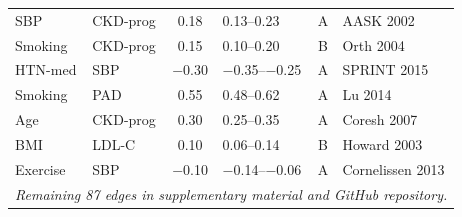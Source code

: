 \documentclass[runningheads]{llncs}
\begin{document}
{\begin{longtable}{@{}p{2.0cm}p{2.0cm}cp{1.4cm}cp{2.8cm}@{}}
SBP & CKD-prog & 0.18 & 0.13--0.23 & A & AASK 2002 \\
Smoking & CKD-prog & 0.15 & 0.10--0.20 & B & Orth 2004 \\
HTN-med & SBP & $-$0.30 & $-$0.35--$-$0.25 & A & SPRINT 2015 \\
Smoking & PAD & 0.55 & 0.48--0.62 & A & Lu 2014 \\
Age & CKD-prog & 0.30 & 0.25--0.35 & A & Coresh 2007 \\
BMI & LDL-C & 0.10 & 0.06--0.14 & B & Howard 2003 \\
Exercise & SBP & $-$0.10 & $-$0.14--$-$0.06 & A & Cornelissen 2013 \\
\midrule
\multicolumn{6}{c}{\small\itshape Remaining 87 edges in supplementary material and GitHub repository.} \\
\end{longtable}
}
\end{document}
